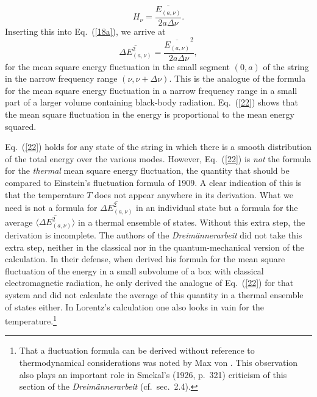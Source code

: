 \documentclass[12pt]{elsart}
\begin{document}
\begin{equation}
H_\nu = \frac{\overline{ E_{(a, \nu)} }}{2 a \Delta \nu}.
\label{21}
\end{equation}
Inserting this into Eq.\ (\ref{18a}), we arrive at
\begin{equation}
\overline{ \Delta E_{(a, \nu)}^2 } = 
\frac{ \overline{E_{(a, \nu)} }^2 }{2a \Delta \nu},
\label{22}
\end{equation}
for the mean square energy fluctuation in the small segment $(0, a)$ of the string  in the narrow frequency range $(\nu, \nu + \Delta \nu)$. This is the analogue of the formula for the mean square energy fluctuation in a narrow frequency range in a small part of a larger volume containing black-body radiation.  Eq.\ (\ref{22}) shows that the mean square fluctuation in the energy is proportional to the mean energy squared. 

Eq.\ (\ref{22}) holds for any state of the string in which there is a smooth distribution of the total energy over the various modes. However, Eq.\ (\ref{22}) is {\it not} the formula for the {\it thermal} mean square energy fluctuation, the quantity that should be compared to Einstein's fluctuation formula of 1909. A clear indication of this is that the temperature $T$ does not appear anywhere in its derivation. What we need is not a formula for $\overline{ \Delta E_{(a, \nu)}^2 }$ in an individual state but a formula for the average $\langle \overline{ \Delta E_{(a, \nu)}^2 } \rangle$ in a thermal ensemble of states. Without this extra step, the derivation is incomplete. The authors of the {\it Dreim\"annerarbeit} did not take this extra step, neither in the classical nor in the quantum-mechanical version of the calculation. In their defense, when \citet{Lorentz 1916}  derived his formula for the mean square fluctuation of the energy in a small subvolume of a box with classical electromagnetic radiation, he only derived the  analogue of Eq.\ (\ref{22}) for that system and did not calculate the average of this quantity in a thermal ensemble of states either. In Lorentz's calculation one also looks in vain for the temperature.\footnote{That a fluctuation formula can be derived without reference to thermodynamical considerations was noted by Max von \citet[p.\ 199]{Laue 1915c} \citep[p.\ 199]{Bach 1989}. This observation also plays an important role in Smekal's (1926, p.\ 321) criticism of this section of the {\it Dreim\"annerarbeit} (cf.\ sec.\ 2.4).}
\end{document}
